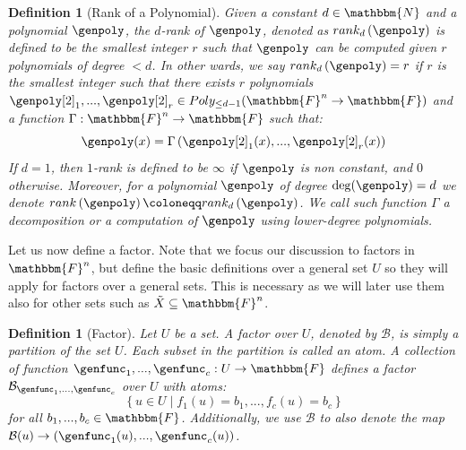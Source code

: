 \documentclass[10pt,a4paper]{article}
\newtheorem{definition}[theorem]{Definition}
\newcommand{\definedas}[0]{\coloneqq}
\newcommand{\parens}[1]{\left( #1 \right)}
\newcommand{\set}[1]{\left\{ #1 \right\}}
\newcommand{\suchthat}[0]{\middle|}
\newcommand{\basefield}[0]{\mathbbm{F}}
\newcommand{\blocklength}[0]{n}
\newcommand{\field}[0]{\basefield^{\blocklength}}
\newcommand{\degree}[0]{d}
\newcommand{\funcdef}[3]{#1:#2\rightarrow#3}
\newcommand{\factor}[0]{\mathcal{B}}
\newcommand{\allpolyset}[3]{Poly_{#1}(#2\rightarrow#3)}
\newcommand{\naturalnumbersset}[0]{\mathbbm{N}}
\newcommand{\variety}{{\tilde{X}}}
\newcommand{\rank}[1]{rank \parens{#1}}
\newcommand{\drank}[2]{rank_{#1} \parens{#2}}
\newcommand{\rankval}[0]{{{r}}}
\begin{document}
\begin{definition}[Rank of a Polynomial]\label{definition:rank}
    Given a constant $\degree \in \naturalnumbersset$ and a polynomial $\genpoly$,
    the \emph{$\degree$-rank} of $\genpoly$, denoted as $\drank{\degree}{\genpoly}$ is defined to be
    the smallest integer $\rankval$ such that $\genpoly$ can be computed given $\rankval$ polynomials of degree $< \degree$.
    In other wards, we say $\drank{\degree}{\genpoly} = \rankval$ if $\rankval$ is the smallest integer such that
    there exists $\rankval$ polynomials $\genpoly[2]_1,...,\genpoly[2]_\rankval \in \allpolyset{\leq \degree - 1}{\field}{\basefield}$
    and a function $\funcdef{\Gamma}{\field}{\basefield}$ such that:
    \[
        \genpoly(x) = \Gamma \parens{\genpoly[2]_1(x),...,\genpoly[2]_\rankval(x)}
    \]
    If $\degree = 1$, then $1$-rank is defined to be $\infty$ if $\genpoly$ is non constant, and $0$ otherwise.
    \newline
    Moreover, for a polynomial $\genpoly$ of degree $\deg(\genpoly) = \degree$ we denote $\rank{\genpoly} \definedas \drank{\degree}{\genpoly}$.
    \newline
    We call such function $\Gamma$ a \emph{decomposition} or a \emph{computation} of $\genpoly$ using lower-degree polynomials.
\end{definition}
Let us now define a factor.
Note that we focus our discussion to factors in $\field$,
but define the basic definitions over a general set $U$ so they will apply for factors over a general sets.
This is necessary as we will later use them also for other sets such as $\variety \subseteq \field$.
\begin{definition}[Factor]
    Let $U$ be a set.
    A \emph{factor over $U$}, denoted by $\factor$, is simply a partition of the set $U$.
    Each subset in the partition is called an \emph{atom}.
    \newline
    A collection of function $\funcdef{\genfunc_1,...,\genfunc_c}{U}{\basefield}$ defines a factor $\factor_{\genfunc_1,...,\genfunc_c}$ over $U$
    with atoms:
    \[
        \set{u \in U \suchthat f_1(u)=b_1, ..., f_c(u)=b_c}
    \]
    for all $b_1,...,b_c \in \basefield$.
    \newline
    Additionally, we use $\factor$ to also denote the map $\factor(u) \rightarrow (\genfunc_1(u),...,\genfunc_c(u))$.
\end{definition}
\end{document}
